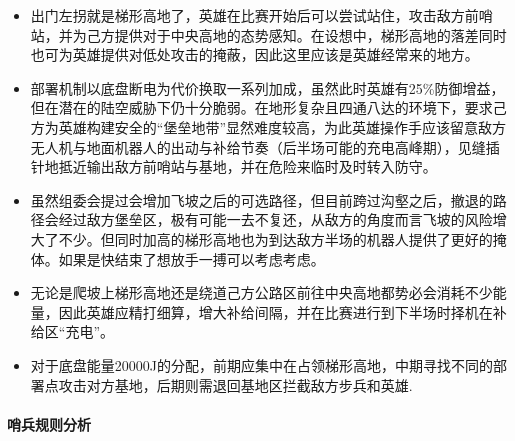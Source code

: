             \begin{itemize}
                \item 出门左拐就是梯形高地了，英雄在比赛开始后可以尝试站住，攻击敌方前哨站，并为己方提供对于中央高地的态势感知。在设想中，梯形高地的落差同时也可为英雄提供对低处攻击的掩蔽，因此这里应该是英雄经常来的地方。
                \item 部署机制以底盘断电为代价换取一系列加成，虽然此时英雄有25\%防御增益，但在潜在的陆空威胁下仍十分脆弱。在地形复杂且四通八达的环境下，要求己方为英雄构建安全的“堡垒地带”显然难度较高，为此英雄操作手应该留意敌方无人机与地面机器人的出动与补给节奏（后半场可能的充电高峰期），见缝插针地抵近输出敌方前哨站与基地，并在危险来临时及时转入防守。
                \item 虽然组委会提过会增加飞坡之后的可选路径，但目前跨过沟壑之后，撤退的路径会经过敌方堡垒区，极有可能一去不复还，从敌方的角度而言飞坡的风险增大了不少。但同时加高的梯形高地也为到达敌方半场的机器人提供了更好的掩体。如果是快结束了想放手一搏可以考虑考虑。
                \item 无论是爬坡上梯形高地还是绕道己方公路区前往中央高地都势必会消耗不少能量，因此英雄应精打细算，增大补给间隔，并在比赛进行到下半场时择机在补给区“充电”。
                \item 对于底盘能量20000J的分配，前期应集中在占领梯形高地，中期寻找不同的部署点攻击对方基地，后期则需退回基地区拦截敌方步兵和英雄.
            \end{itemize}

        \paragraph{哨兵规则分析}

    
